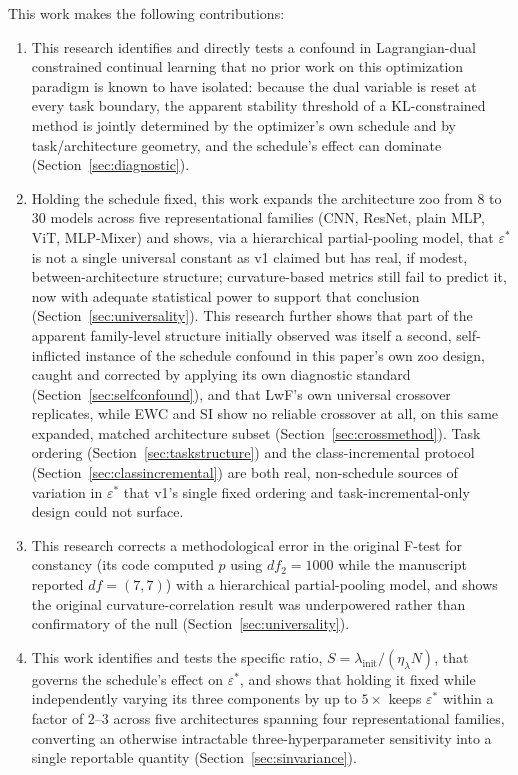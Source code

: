 \documentclass[11pt]{article}
\newcommand{\eps}{\varepsilon}
\newcommand{\epsstar}{\eps^{*}}
\begin{document}
This work makes the following contributions:
\begin{enumerate}
    \item This research identifies and directly tests a confound in Lagrangian-dual
    constrained continual learning that no prior work on
    this optimization paradigm is known to have isolated: because the dual variable is
    reset at every task boundary, the apparent stability threshold of a
    KL-constrained method is jointly determined by the optimizer's own
    schedule and by task/architecture geometry, and the schedule's effect
    can dominate (Section~\ref{sec:diagnostic}).
    \item Holding the schedule fixed, this work expands the architecture zoo from 8
    to 30 models across five representational families (CNN, ResNet, plain
    MLP, ViT, MLP-Mixer) and shows, via a hierarchical partial-pooling model,
    that $\epsstar$ is not a single universal constant as v1 claimed but has
    real, if modest, between-architecture structure; curvature-based metrics
    still fail to predict it, now with adequate statistical power to support
    that conclusion (Section~\ref{sec:universality}). This research further shows that
    part of the apparent family-level structure initially observed was
    itself a second, self-inflicted instance of the schedule confound in
    this paper's own zoo design, caught and corrected by applying its own
    diagnostic standard (Section~\ref{sec:selfconfound}), and that LwF's own
    universal crossover replicates, while EWC and SI show no reliable
    crossover at all, on this same expanded, matched architecture subset
    (Section~\ref{sec:crossmethod}). Task ordering (Section~\ref{sec:taskstructure})
    and the class-incremental protocol (Section~\ref{sec:classincremental})
    are both real, non-schedule sources of variation in $\epsstar$ that v1's
    single fixed ordering and task-incremental-only design could not surface.
    \item This research corrects a methodological error in the original F-test for
    constancy (its code computed $p$ using $df_2=1000$ while the manuscript
    reported $df=(7,7)$) with a hierarchical partial-pooling model, and shows
    the original curvature-correlation result was underpowered rather than
    confirmatory of the null (Section~\ref{sec:universality}).
    \item This work identifies and tests the specific ratio,
    $S=\lambda_{\mathrm{init}}/(\eta_\lambda N)$, that governs the
    schedule's effect on $\epsstar$, and shows that holding it fixed while
    independently varying its three components by up to $5\times$ keeps
    $\epsstar$ within a factor of $2$--$3$ across five architectures
    spanning four representational families, converting an otherwise intractable three-hyperparameter
    sensitivity into a single reportable quantity
    (Section~\ref{sec:sinvariance}).
\end{enumerate}
\end{document}
